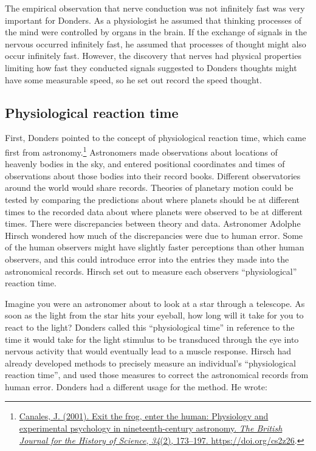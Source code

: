 \documentclass[
  oneside,
  12pt]{crumpbook}
\begin{document}
The empirical observation that nerve conduction was not infinitely fast was very important for Donders. As a physiologist he assumed that thinking processes of the mind were controlled by organs in the brain. If the exchange of signals in the nervous occurred infinitely fast, he assumed that processes of thought might also occur infinitely fast. However, the discovery that nerves had physical properties limiting how fast they conducted signals suggested to Donders thoughts might have some measurable speed, so he set out record the speed thought.

\hypertarget{physiological-reaction-time}{%
\subsection{Physiological reaction time}\label{physiological-reaction-time}}

First, Donders pointed to the concept of physiological reaction time, which came first from astronomy.\footnote{\protect\hyperlink{ref-canalesExitFrogEnter2001}{Canales, J. (2001). Exit the frog, enter the human: Physiology and experimental psychology in nineteenth-century astronomy. \emph{The British Journal for the History of Science}, \emph{34}(2), 173--197. \url{https://doi.org/cs2z26}}.} Astronomers made observations about locations of heavenly bodies in the sky, and entered positional coordinates and times of observations about those bodies into their record books. Different observatories around the world would share records. Theories of planetary motion could be tested by comparing the predictions about where planets should be at different times to the recorded data about where planets were observed to be at different times. There were discrepancies between theory and data. Astronomer Adolphe Hirsch wondered how much of the discrepancies were due to human error. Some of the human observers might have slightly faster perceptions than other human observers, and this could introduce error into the entries they made into the astronomical records. Hirsch set out to measure each observers ``physiological'' reaction time.

Imagine you were an astronomer about to look at a star through a telescope. As soon as the light from the star hits your eyeball, how long will it take for you to react to the light? Donders called this ``physiological time'' in reference to the time it would take for the light stimulus to be transduced through the eye into nervous activity that would eventually lead to a muscle response. Hirsch had already developed methods to precisely measure an individual's ``physiological reaction time'', and used those measures to correct the astronomical records from human error. Donders had a different usage for the method. He wrote:
\end{document}
